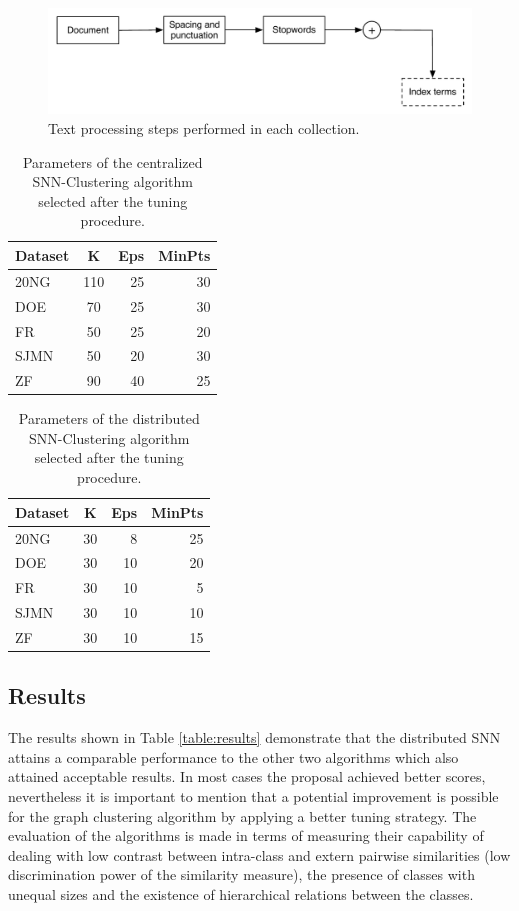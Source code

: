 \documentclass[a4paper]{article}
\begin{document}
\begin{figure}[!htbp]
\centering
  \includegraphics[scale=0.7]
  {text_processing_steps.pdf}
  \caption{Text processing steps performed in each collection.}
  \label{fig:text_processing}
\end{figure}


\begin{table}[!htbp]
\centering
\begin{tabular}{l|crr}
\textbf{Dataset} & \textbf{K} & \textbf{Eps} & \textbf{MinPts} \\ \hline
20NG    & 110& 25 & 30 \\
DOE     &  70& 25 & 30 \\
FR      &  50& 25 & 20  \\
SJMN    &  50& 20 & 30 \\
ZF      &  90& 40 & 25 \\ \hline
\end{tabular}
\caption{Parameters of the centralized SNN-Clustering algorithm selected after the tuning procedure.}
\label{table:centralizedsnn_params}
\end{table}


\begin{table}[!htbp]
\centering
\begin{tabular}{l|crr}
\textbf{Dataset} & \textbf{K} & \textbf{Eps} & \textbf{MinPts} \\ \hline
20NG    & 30& 8 & 25 \\
DOE     & 30& 10& 20 \\
FR      & 30& 10& 5  \\
SJMN    & 30& 10& 10 \\
ZF      & 30& 10& 15 \\ \hline
\end{tabular}
\caption{Parameters of the distributed SNN-Clustering algorithm selected after the tuning procedure.}
\label{table:distributedsnn_params}
\end{table}


\subsection*{Results}
The results shown in Table \ref{table:results} demonstrate that the distributed SNN attains a comparable performance to the other two algorithms which also attained acceptable results. In most cases the proposal achieved better scores, nevertheless it is important to mention that a potential improvement is possible for the graph clustering algorithm by applying a better tuning strategy. 
The  evaluation of the algorithms is made in terms of measuring their capability of dealing with low contrast between intra-class and extern pairwise similarities (low discrimination power of the similarity measure), the presence of classes with unequal sizes and the existence of hierarchical relations between the classes.
\end{document}

